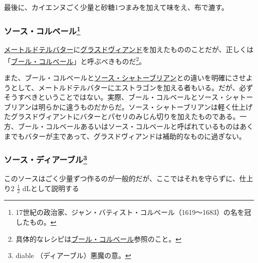 \begin{recette}
最後に、カイエンヌごく少量と砂糖1つまみを加えて味をえ、布で漉す。

\hypertarget{sauce-colbert}{%
\subsubsection[ソース・コルベール]{\texorpdfstring{ソース・コルベール\footnote{17世紀の政治家、ジャン・バティスト・コルベール（1619〜1683）の名を冠したもの。}}{ソース・コルベール}}\label{sauce-colbert}}



\protect\hyperlink{beurre-maitre-d-hotel}{メートルドテルバター}に\protect\hyperlink{glace-de-viande}{グラスドヴィアンド}を加えたもののことだが、正しくは「\protect\hyperlink{beurre-colbert}{ブール・コルベール}」と呼ぶべきものだ\footnote{具体的なレシピは\protect\hyperlink{beurre-colbert}{ブール・コルベール}参照のこと。}。

また、ブール・コルベールと\protect\hyperlink{sauce-chateaubriand}{ソース・シャトーブリアン}との違いを明確にさせようとして、メートルドテルバターにエストラゴンを加える者もいる。だが、必ずそうすべきということではない。実際、ブール・コルベールとソース・シャトーブリアンは明らかに違うものだからだ。ソース・シャトーブリアンは軽く仕上げたグラスドヴィアントにバターとパセリのみじん切りを加えたものである。一方、ブール・コルベールあるいはソース・コルベールと呼ばれているものはあくまでもバターが主であって、グラスドヴィアンドは補助的なものに過ぎない。

\hypertarget{sauce-diable}{%
\subsubsection[ソース・ディアーブル]{\texorpdfstring{ソース・ディアーブル\footnote{diable
  （ディアーブル）悪魔の意。}}{ソース・ディアーブル}}\label{sauce-diable}}



このソースはごく少量ずつ作るのが一般的だが、ここではそれを守らずに、仕上り2
\(\frac{1}{2}\) dLとして説明する


\end{recette}
